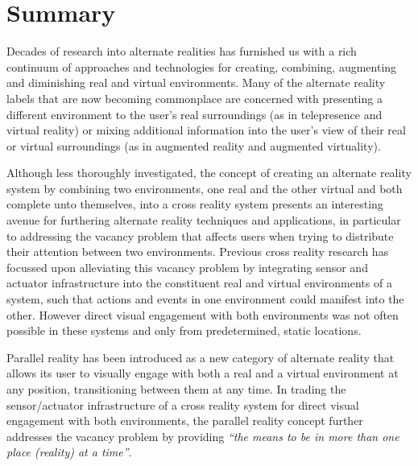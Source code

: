 
\section{Summary}
Decades of research into alternate realities has furnished us with a rich continuum of approaches and technologies for creating, combining, augmenting and diminishing real and virtual environments. Many of the alternate reality labels that are now becoming commonplace are concerned with presenting a different environment to the user's real surroundings (as in telepresence and virtual reality) or mixing additional information into the user's view of their real or virtual surroundings (as in augmented reality and augmented virtuality).

Although less thoroughly investigated, the concept of creating an alternate reality system by combining two environments, one real and the other virtual and both complete unto themselves, into a cross reality system presents an interesting avenue for furthering alternate reality techniques and applications, in particular to addressing the vacancy problem that affects users when trying to distribute their attention between two environments. Previous cross reality research has focussed upon alleviating this vacancy problem by integrating sensor and actuator infrastructure into the constituent real and virtual environments of a system, such that actions and events in one environment could manifest into the other. However direct visual engagement with both environments was not often possible in these systems and only from predetermined, static locations.

Parallel reality has been introduced as a new category of alternate reality that allows its user to visually engage with both a real and a virtual environment at any position, transitioning between them at any time. In trading the sensor/actuator infrastructure of a cross reality system for direct visual engagement with both environments, the parallel reality concept further addresses the vacancy problem by providing \textit{``the means to be in more than one place (reality) at a time''}\cite{Lifton2007a}.